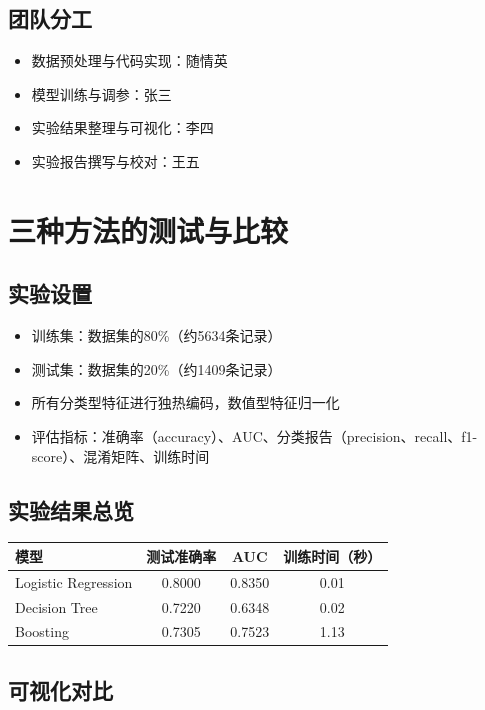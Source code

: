 \documentclass[12pt,a4paper]{article}
\begin{document}
\subsection{团队分工}
\begin{itemize}
    \item 数据预处理与代码实现：随情英
    \item 模型训练与调参：张三
    \item 实验结果整理与可视化：李四
    \item 实验报告撰写与校对：王五
\end{itemize}

\section{三种方法的测试与比较}

\subsection{实验设置}
\begin{itemize}
    \item 训练集：数据集的80\%（约5634条记录）
    \item 测试集：数据集的20\%（约1409条记录）
    \item 所有分类型特征进行独热编码，数值型特征归一化
    \item 评估指标：准确率（accuracy）、AUC、分类报告（precision、recall、f1-score）、混淆矩阵、训练时间
\end{itemize}

\subsection{实验结果总览}

\begin{longtable}{|l|c|c|c|}
\hline
模型 & 测试准确率 & AUC & 训练时间（秒） \\
\hline
Logistic Regression & 0.8000 & 0.8350 & 0.01 \\
Decision Tree       & 0.7220 & 0.6348 & 0.02 \\
Boosting            & 0.7305 & 0.7523 & 1.13 \\
\hline
\end{longtable}

\subsection{可视化对比}
\end{document}
